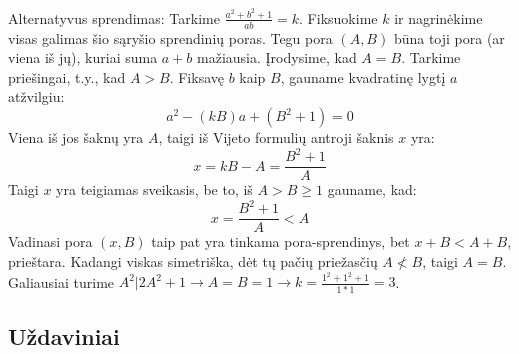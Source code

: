 Alternatyvus sprendimas:
Tarkime $\frac{a^2+b^2+1}{ab}=k$. Fiksuokime $k$ ir nagrinėkime visas galimas šio sąryšio sprendinių poras. Tegu pora $(A,B)$ būna toji pora (ar viena iš jų), kuriai suma $a+b$ mažiausia. Įrodysime, kad $A=B$. Tarkime priešingai, t.y., kad $A>B$. Fiksavę $b$ kaip $B$, gauname kvadratinę lygtį $a$ atžvilgiu: $$a^2-(kB)a+(B^2+1)=0$$ Viena iš jos šaknų yra $A$, taigi iš Vijeto formulių antroji šaknis $x$ yra: $$x=kB-A=\frac{B^2+1}{A}$$ Taigi $x$ yra teigiamas sveikasis, be to, iš $A>B\geq 1$ gauname, kad: $$x=\frac{B^2+1}{A}<A$$ Vadinasi pora $(x,B)$ taip pat yra tinkama pora-sprendinys, bet $x+B<A+B$, prieštara. Kadangi viskas simetriška, dėt tų pačių priežasčių $A\not< B$, taigi $A=B$. Galiausiai turime $A^2|2A^2+1\rightarrow A=B=1\rightarrow k=\frac{1^2+1^2+1}{1*1}=3$.
\subsection{Uždaviniai}
